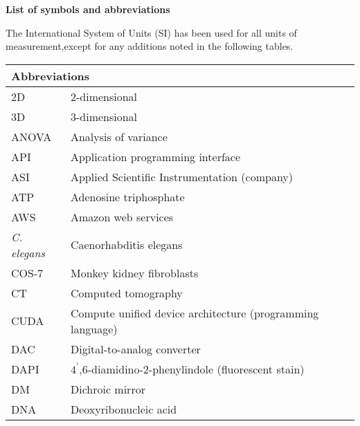
 \vspace*{3em} \thispagestyle{empty}
\begin {flushleft} 
	\huge \textbf{List of symbols and abbreviations} 
\end{flushleft} 
\vspace*{2em}

\begin{flushleft}
The International System of Units (SI) has been used for all units of measurement,\newline except for any additions noted in the following tables.

\begin{longtable}[l]{|p{5.5em}|p{25em}|}
\hline 
\multicolumn{2}{|l|}{\textbf{Abbreviations}} \\
\hline 
2D         & 2-dimensional                                              \\
3D         & 3-dimensional                                              \\
ANOVA      & Analysis of variance                                       \\
API        & Application programming interface                          \\
ASI        & Applied Scientific Instrumentation (company)               \\
ATP        & Adenosine triphosphate                                     \\
AWS        & Amazon web services                                        \\
\textit{C. elegans} & Caenorhabditis elegans                                     \\
COS-7      & Monkey kidney fibroblasts                                  \\
CT         & Computed tomography                                        \\
CUDA       & Compute unified device architecture (programming language) \\
DAC        & Digital-to-analog converter                                \\
DAPI       & $4^\prime$,6-diamidino-2-phenylindole (fluorescent stain)          \\
DM         & Dichroic mirror                                            \\
DNA        & Deoxyribonucleic acid                                      \\

\end{longtable}
\end{flushleft}
